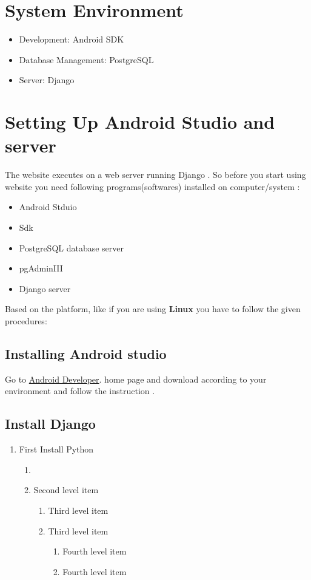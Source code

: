 \documentclass[]{article}
\begin{document}
\section{System Environment}
\begin{itemize}
\item Development: Android SDK
\item Database Management: PostgreSQL 
\item Server: Django
\end{itemize}
\section{Setting Up Android Studio and server }
The website executes on a web server running Django . So before you start using website you need following programs(softwares) installed on computer/system :
\begin{itemize}
\item Android Stduio
\item Sdk
\item PostgreSQL database server
\item pgAdminIII
\item Django server
\end{itemize}

Based on the platform, like if you are using \textbf{Linux} you have to follow the given procedures:\\
\subsection{Installing Android studio}
Go to \href{https://developer.android.com/studio/index.html}{Android Developer}. home page and download according to your environment and follow the instruction .


\subsection{Install Django}
\begin{enumerate}
   \item First Install Python
   
   \begin{enumerate}
     \item 
     \item Second level item
     \begin{enumerate}
       \item Third level item
       \item Third level item
       \begin{enumerate}
         \item Fourth level item
         \item Fourth level item
       \end{enumerate}
     \end{enumerate}
   \end{enumerate}
 \end{enumerate}
\end{document}
